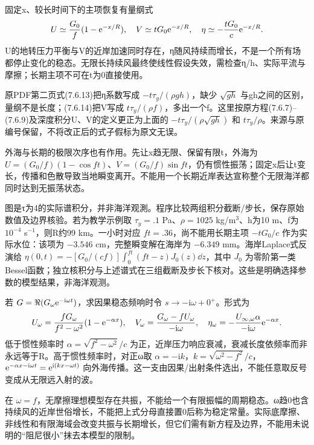 固定x、较长时间下的主项恢复有量纲式
\[
 U\simeq\frac{G_0}{f}(1-\mathrm e^{-x/R}),\quad
 V\simeq tG_0\mathrm e^{-x/R},\quad
 \eta\simeq-\frac{tG_0}{c}\mathrm e^{-x/R}.
\]
U的地转压力平衡与V的近岸加速同时存在，η随风持续而增长，不是一个所有场都停止变化的稳态。无限长持续风最终使线性假设失效，需检查η/h、实际平流与摩擦；长期主项不可在t为0直接使用。

原PDF第二页式(7.6.13)把η系数写成 $-t\tau_y/(\rho gh)$，缺少 $\sqrt{gh}$ 与gh之间的区别，量纲不是长度；(7.6.14)把V写成 $t\tau_y/(\rho f)$，多出一个f。这里按原方程(7.6.7)--(7.6.9)及深度积分U、V的定义更正为上面的 $-t\tau_y/(\rho\sqrt{gh})$ 和 $t\tau_y/\rho$。来源与原编号保留，不将改正后的式子假标为原文无误。

外海与长期的极限次序也有作用。先让x趋无限、保留有限t，外海为 $U=(G_0/f)(1-\cos ft)$、$V=(G_0/f)\sin ft$，仍有惯性振荡；固定x后让t变长，传播和色散导致当地瞬变离开。不能用一个长期近岸表达宣称整个无限海洋都同时达到无振荡状态。

\begin{center}\end{center}
图是τ为4的实际谱积分，并非海洋观測。程序比较两组积分截断/步长，保存原始数值及边界核验。若为教学示例取 $\tau_y=.1$ Pa、$\rho=1025$ kg/m$^3$、h为10 m、f为 $10^{-4}$ s$^{-1}$，则R约99 km。一小时对应 $ft=.36$，尚不能用长期主项 $-tG_0/c$ 作为实际水位：该项为 $-3.546$ cm，完整瞬变解在海岸为 $-6.349$ mm。海岸Laplace式反演给 $\eta(0,t)=-[G_0/(cf)]\int_0^{ft}(ft-z)J_0(z)\dd z$，其中 $J_0$ 为零阶第一类Bessel函数；独立核积分与上述谱式在三组截断及步长下核对。这些是明确选择参数的模型结果，非海洋观测。

若 $G=\Re(G_\omega\mathrm e^{-\mathrm i\omega t})$，求因果稳态频响时令 $s\to-\mathrm i\omega+0^+$。形式为
\[
 U_\omega=\frac{fG_\omega}{f^2-\omega^2}(1-\mathrm e^{-\alpha x}),\quad
 V_\omega=\frac{G_\omega-fU_\omega}{-\mathrm i\omega},\quad
 \eta_\omega=-\frac{U_{\infty,\omega}\alpha}{-\mathrm i\omega}\mathrm e^{-\alpha x}.
\]
低于惯性频率时 $\alpha=\sqrt{f^2-\omega^2}/c$ 为正，近岸压力响应衰减，衰减长度依频率而非永远等于R。高于惯性频率时，对正ω取 $\alpha=-\mathrm ik$，$k=\sqrt{\omega^2-f^2}/c$，$\mathrm e^{-\alpha x-\mathrm i\omega t}=\mathrm e^{\mathrm i(kx-\omega t)}$ 向外海传播。这一支由因果/出射条件选出，不能任意取反号变成从无限远入射的波。

在 $\omega=f$，无摩擦理想模型存在共振，不能给一个有限振幅的周期稳态。ω趋0也含持续风的近岸世俗增长，不能把上式分母直接置0后称为稳定常量。实际底摩擦、非线性和有限海域会改变共振与长期增长，但它们需有新方程及边界，不能用未说明的“阻尼很小”抹去本模型的限制。
